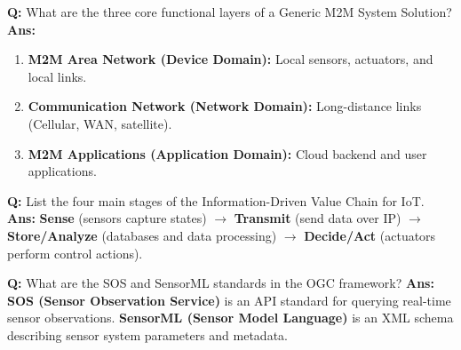 \documentclass[10pt,a4paper,twocolumn]{article}
\begin{document}
\begin{tcolorbox}[
  colback=white,
  colframe=UnitColorOne,
  colbacktitle=gray!10!white,
  coltitle=black,
  fonttitle=\bfseries\sffamily\small,
  title={Unit I $\bullet$ Card 10},
  boxrule=1.2pt,
  arc=2mm,
  outer arc=2mm,
  boxsep=1.5mm,
  top=1mm,
  bottom=1mm,
  left=1.5mm,
  right=1.5mm,
  before skip=2.5mm,
  after skip=2.5mm
]
\textbf{Q:} What are the three core functional layers of a Generic M2M System Solution?
\tcbline
\textbf{Ans:} \begin{enumerate}
  \item \textbf{M2M Area Network (Device Domain):} Local sensors, actuators, and local links.
  \item \textbf{Communication Network (Network Domain):} Long-distance links (Cellular, WAN, satellite).
  \item \textbf{M2M Applications (Application Domain):} Cloud backend and user applications.
\end{enumerate}
\end{tcolorbox}


\begin{tcolorbox}[
  colback=white,
  colframe=UnitColorOne,
  colbacktitle=gray!10!white,
  coltitle=black,
  fonttitle=\bfseries\sffamily\small,
  title={Unit I $\bullet$ Card 11},
  boxrule=1.2pt,
  arc=2mm,
  outer arc=2mm,
  boxsep=1.5mm,
  top=1mm,
  bottom=1mm,
  left=1.5mm,
  right=1.5mm,
  before skip=2.5mm,
  after skip=2.5mm
]
\textbf{Q:} List the four main stages of the Information-Driven Value Chain for IoT.
\tcbline
\textbf{Ans:} \textbf{Sense} (sensors capture states) $\rightarrow$ \textbf{Transmit} (send data over IP) $\rightarrow$ \textbf{Store/Analyze} (databases and data processing) $\rightarrow$ \textbf{Decide/Act} (actuators perform control actions).
\end{tcolorbox}


\begin{tcolorbox}[
  colback=white,
  colframe=UnitColorOne,
  colbacktitle=gray!10!white,
  coltitle=black,
  fonttitle=\bfseries\sffamily\small,
  title={Unit I $\bullet$ Card 12},
  boxrule=1.2pt,
  arc=2mm,
  outer arc=2mm,
  boxsep=1.5mm,
  top=1mm,
  bottom=1mm,
  left=1.5mm,
  right=1.5mm,
  before skip=2.5mm,
  after skip=2.5mm
]
\textbf{Q:} What are the SOS and SensorML standards in the OGC framework?
\tcbline
\textbf{Ans:} \textbf{SOS (Sensor Observation Service)} is an API standard for querying real-time sensor observations. \textbf{SensorML (Sensor Model Language)} is an XML schema describing sensor system parameters and metadata.
\end{tcolorbox}
\end{document}
